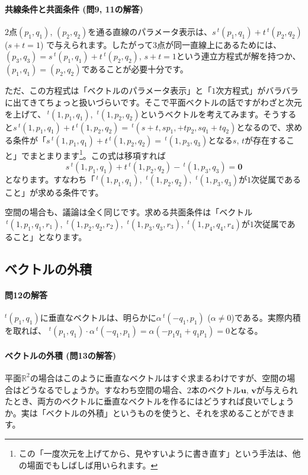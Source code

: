 \paragraph{共線条件と共面条件 (問9, 11の解答)}

$2$点$(p_1,q_1)$, $(p_2,q_2)$を通る直線のパラメータ表示は、$s\,{}^t(p_1,q_1)+t\,{}^t(p_2,q_2)$ ($s+t=1$) で与えられます。したがって$3$点が同一直線上にあるためには、$(p_3,q_3)=s\,{}^t(p_1,q_1)+t\,{}^t(p_2,q_2)$, $s+t=1$という連立方程式が解を持つか、$(p_1,q_1)=(p_2,q_2)$であることが必要十分です。

ただ、この方程式は「ベクトルのパラメータ表示」と「$1$次方程式」がバラバラに出てきてちょっと扱いづらいです。そこで平面ベクトルの話ですがわざと次元を上げて、$\,{}^t(1, p_1, q_1)$, $\,{}^t(1, p_2, q_2)$というベクトルを考えてみます。そうすると$s\,{}^t(1, p_1, q_1) + t\,{}^t(1, p_2, q_2) = \,{}^t( s+t, s p_1,+ t p_2, s q_1 + t q_2)$となるので、求める条件が「$s\,{}^t(1, p_1, q_1)+t\,{}^t(1, p_2, q_2) = \,{}^t(1, p_3, q_3)$となる$s$, $t$が存在すること」でまとまります\footnote{この「一度次元を上げてから、見やすいように書き直す」という手法は、他の場面でもしばしば用いられます。}。この式は移項すれば
\[
s\,{}^t(1, p_1, q_1)+t\,{}^t(1, p_2, q_2) - \,{}^t(1, p_3, q_3) = \bm{0}
\]
となります。すなわち「$\,{}^t(1,p_1,q_1)$, $\,{}^t(1, p_2, q_2)$, $\,{}^t(1, p_3, q_3)$が$1$次従属であること」が求める条件です。

空間の場合も、議論は全く同じです。求める共面条件は「ベクトル$\,{}^t(1,p_1,q_1,r_1)$, $\,{}^t(1,p_2,q_2,r_2)$, $\,{}^t(1,p_3,q_3,r_3)$, $\,{}^t(1,p_4,q_4,r_4)$が$1$次従属であること」となります。

\subsection{ベクトルの外積}

\paragraph{問12の解答} ${}^t(p_1,q_1)$に垂直なベクトルは、明らかに$\alpha\,{}^t(-q_1,p_1)$ ($\alpha\neq 0$)である。実際内積を取れば、
${}^t(p_1, q_1)\cdot\alpha \,{}^t(-q_1,p_1) = \alpha(- p_1 q_1 + q_1 p_1 ) =0$となる。

\paragraph{ベクトルの外積 (問13の解答)}

平面$\mathbb{R}^2$の場合はこのように垂直なベクトルはすぐ求まるわけですが、空間の場合はどうなるでしょうか。すなわち空間の場合、$2$本のベクトル$\bm{u}$, $\bm{v}$が与えられたとき、両方のベクトルに垂直なベクトルを作るにはどうすれば良いでしょうか。実は「ベクトルの外積」というものを使うと、それを求めることができます。

